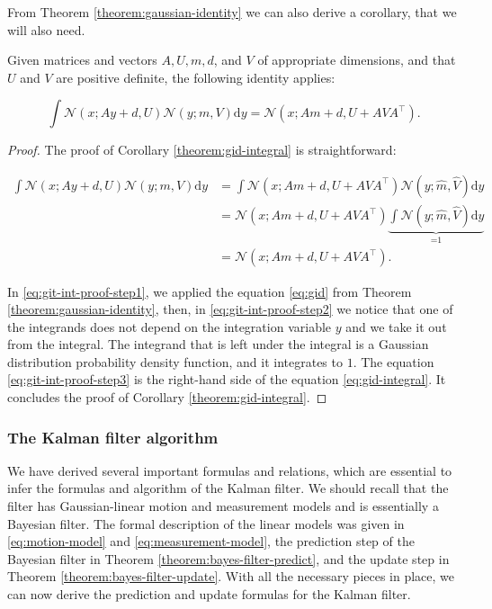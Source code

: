 From Theorem \ref{theorem:gaussian-identity} we can also derive a corollary, that we will also need.

\begin{corollary}\label{theorem:gid-integral}
    Given matrices and vectors $A, U, m, d$, and $V$ of appropriate dimensions, and that $U$ and $V$ are positive definite, the following identity applies:

    \begin{equation}\label{eq:gid-integral}
        \int \mathscr{N}(x ; A y + d, U) \mathscr{N}(y ; m, V) \mathrm{d}y=\mathscr{N}(x ; A m + d, U + A V A^\intercal).
    \end{equation}
\end{corollary}

\begin{proof}
    The proof of Corollary \ref{theorem:gid-integral} is straightforward:

    \begin{align}
        \int \mathscr{N}(x ; A y + d, U) \mathscr{N}(y ; m, V) \mathrm{d}y 
        &= \int \mathscr{N}(x ; A m + d, U + A V A^\intercal) \mathscr{N}(y ; \hat{m}, \hat{V}) \mathrm{d}y \label{eq:git-int-proof-step1} \\
        &= \mathscr{N}(x ; A m + d, U + A V A^\intercal) \underbrace{\int \mathscr{N}(y ; \hat{m}, \hat{V}) \mathrm{d}y}_{\text{=1}} \label{eq:git-int-proof-step2}\\
        &= \mathscr{N}(x ; A m + d, U + A V A^\intercal). \label{eq:git-int-proof-step3}
    \end{align}

    In \ref{eq:git-int-proof-step1}, we applied the equation \ref{eq:gid} from Theorem \ref{theorem:gaussian-identity}, then, in \ref{eq:git-int-proof-step2} we notice that one of the integrands does not depend on the integration variable $y$ and we take it out from the integral. The integrand that is left under the integral is a Gaussian distribution probability density function, and it integrates to $1$. The equation \ref{eq:git-int-proof-step3} is the right-hand side of the equation \ref{eq:gid-integral}. It concludes the proof of Corollary \ref{theorem:gid-integral}.
\end{proof}

\subsubsection{The Kalman filter algorithm}

We have derived several important formulas and relations, which are essential to infer the formulas and algorithm of the Kalman filter. We should recall that the filter has Gaussian-linear motion and measurement models and is essentially a Bayesian filter. The formal description of the linear models was given in \ref{eq:motion-model} and \ref{eq:measurement-model}, the prediction step of the Bayesian filter in Theorem \ref{theorem:bayes-filter-predict}, and the update step in Theorem \ref{theorem:bayes-filter-update}. With all the necessary pieces in place, we can now derive the prediction and update formulas for the Kalman filter.

